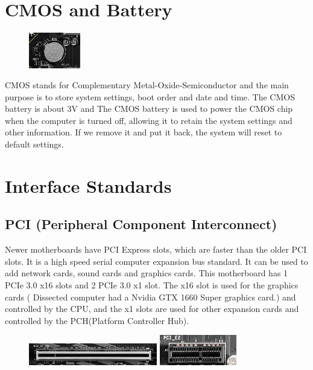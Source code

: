 \documentclass{article}
\begin{document}
\section{CMOS and Battery}

\begin{figure}
	\vspace{-20pt} 
	\centering
	\includegraphics[width=0.2\textwidth]{cmos.jpg}
\end{figure}

CMOS stands for Complementary Metal-Oxide-Semiconductor and the main purpose is to store system 
settings, boot order and date and time. The CMOS battery is about 3V and The CMOS battery is used to 
power the CMOS chip when the computer is turned off, allowing it to retain the system settings and 
other information. If we remove it and put it back, the system will reset to default settings.


\section{Interface Standards}
\subsection{PCI (Peripheral Component Interconnect)}

Newer motherboards have PCI Express slots, which are faster than the older PCI slots. It is a
high speed serial computer expansion bus standard. It can be used to add network cards, sound
cards and graphics cards. This motherboard has 1 PCIe 3.0 x16 slots and 2 PCIe 3.0 x1 slot. The
x16 slot is used for the graphics cards ( Dissected computer had a Nvidia GTX 1660 Super graphics card.) and controlled by the CPU, and the x1 slots are used for
other expansion cards and controlled by the PCH(Platform Controller Hub).


\begin{figure}[h]
	\centering
	\includegraphics[width=0.5\textwidth]{pci x16.jpg}
	\includegraphics[width=0.3\textwidth]{pci x1.jpg}
\end{figure}
\end{document}
